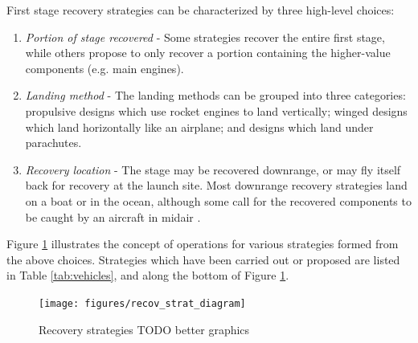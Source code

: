 \documentclass[conf]{new-aiaa}
\begin{document}
First stage recovery strategies can be characterized by three high-level choices:
\begin{enumerate}
	\item \textit{Portion of stage recovered} - Some strategies recover the entire first stage, while others propose to only recover a portion containing the higher-value components (e.g. main engines).
	\item \textit{Landing method} - The landing methods can be grouped into three categories: propulsive designs which use rocket engines to land vertically; winged designs which land horizontally like an airplane; and designs which land under parachutes.
	\item \textit{Recovery location} - The stage may be recovered downrange, or may fly itself back for recovery at the launch site. Most downrange recovery strategies land on a boat or in the ocean, although some call for the recovered components to be caught by an aircraft in midair \cite{Ragab2015, Stappert2017}.
\end{enumerate}

Figure \ref{fig:recov_strat_diagram} illustrates the concept of operations for various strategies formed from the above choices. Strategies which have been carried out or proposed are listed in Table \ref{tab:vehicles}, and along the bottom of Figure \ref{fig:recov_strat_diagram}.

\begin{figure}[hbt!]
	\centering
	\texttt{[image: figures/recov\_strat\_diagram]}
	\caption{\label{fig:recov_strat_diagram} Recovery strategies TODO better graphics}
\end{figure}
\end{document}
